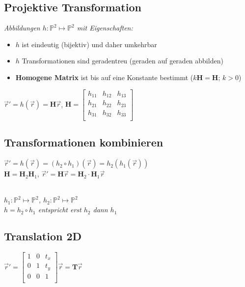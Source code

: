 

\subsection{Projektive Transformation}

\textit{
    Abbildungen $h: \mathbb{P}^2 \mapsto \mathbb{P}^2$
    mit Eigenschaften:
}

\begin{itemize}
    \item $h$ ist eindeutig (bijektiv) und daher umkehrbar
    \item $h$ Transformationen sind geradentreu (geraden auf geraden abbilden)
    \item \textbf{Homogene Matrix} ist bis auf eine Konstante bestimmt ($k\mathbf{H} = \mathbf{H}$; $k > 0$)
\end{itemize}

$\vec{r}' = h(\vec{r}) = \mathbf{H} \vec{r}$, $\mathbf{H} = \begin{bmatrix}
    h_{11} & h_{12} & h_{13} \\
    h_{21} & h_{22} & h_{23} \\
    h_{31} & h_{32} & h_{33} \\
\end{bmatrix}$

\subsection{Transformationen kombinieren}

$\vec{r} ' = h(\vec{r}) = (h_2 \circ h_1)(\vec{r}) = h_2(h_1(\vec{r}))$\\

$\mathbf{H} = \mathbf{H}_2\mathbf{H}_1$,
$\vec{r} ' = \mathbf{H}\vec{r} = \mathbf{H}_2 \cdot \mathbf{H}_1\vec{r}$

\textit{\\
    $h_1: \mathbb{P}^2 \mapsto \mathbb{P}^2$,
    $h_2: \mathbb{P}^2 \mapsto \mathbb{P}^2$ \\
    $h = h_2 \circ h_1$ entspricht erst $h_2$ dann $h_1$
}

\subsection{Translation 2D}

$\vec{r} ' = \left[\begin{array}{cc|c}
    1 & 0 & t_x \\
    0 & 1 & t_y \\
    \hline
    0 & 0 & 1 \\
\end{array}\right]
\vec{r} = \mathbf{T} \vec{r}$ \\

